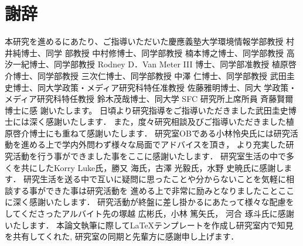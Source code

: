 \chapter*{謝辞}
\label{thanks}
本研究を進めるにあたり、ご指導いただいた慶應義塾大学環境情報学部教授 村井純博士、同学
部教授 中村修博士、同学部教授 楠本博之博士、同学部教授 高汐一紀博士、同学部教授 Rodney
D．Van Meter III 博士、同学部准教授 植原啓介博士、同学部教授 三次仁博士、同学部教授 中澤
仁博士、同学部教授 武田圭史博士、同大学政策・メディア研究科特任准教授 佐藤雅明博士、同大
学政策・メディア研究科特任教授 鈴木茂哉博士、同大学 SFC 研究所上席所員 斉藤賢爾博士に感
謝いたします。
日頃より研究指導をご指導いただきました武田圭史博士には深く感謝いたします．
また，度々研究相談及びご指導いただきました植原啓介博士にも重ねて感謝いたします．
研究室OBである小林怜央氏には研究活動を進める上で学内外問わず様々な局面でアドバイスを頂き，
より充実した研究活動を行う事ができました事をここに感謝いたします．
研究室生活の中で多くを共にしたKorry Luke氏，勝又 海氏，古澤 光毅氏，水野 史暁氏に感謝します．
研究生活を送る中で互いに疑問に思ったことや分からないことを気軽に相談する事ができた事は研究活動を
進める上で非常に励みとなりましたことここに深く感謝いたします．
研究活動が終盤に差し掛かるにあたって様々な配慮をしてくださったアルバイト先の塚越 広彬氏，小林 篤矢氏，
河合 琢斗氏に感謝いたします．
本論文執筆に際して\LaTeX テンプレートを作成し研究室内で知見を共有してくれた,
研究室の同期と先輩方に感謝申し上げます．





